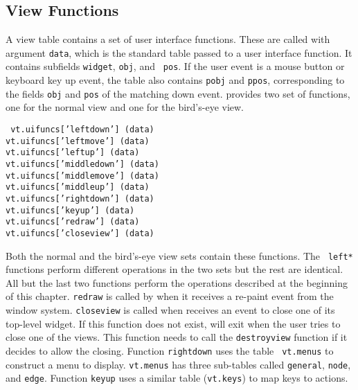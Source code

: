 \subsection{View Functions}

A view table contains a set of user interface functions. These are called with
argument {\tt data}, which is the standard {\LEFTY} table passed to a user
interface function. It contains subfields {\tt widget}, {\tt obj}, and {\tt
pos}. If the user event is a mouse button or keyboard key up event, the table
also contains {\tt pobj} and {\tt ppos}, corresponding to the fields {\tt obj}
and {\tt pos} of the matching down event. {\DOTTY} provides two set of
functions, one for the normal view and one for the bird's-eye view.

\begin{flushleft}\tt
vt.uifuncs['leftdown'] (data)\\
vt.uifuncs['leftmove'] (data)\\
vt.uifuncs['leftup'] (data)\\
vt.uifuncs['middledown'] (data)\\
vt.uifuncs['middlemove'] (data)\\
vt.uifuncs['middleup'] (data)\\
vt.uifuncs['rightdown'] (data)\\
vt.uifuncs['keyup'] (data)\\
vt.uifuncs['redraw'] (data)\\
vt.uifuncs['closeview'] (data)\\
\end{flushleft}\vspace{-2\itemsep}
Both the normal and the bird's-eye view sets contain these functions.  The {\tt
left*} functions perform different operations in the two sets but the rest are
identical.  All but the last two functions perform the operations described at
the beginning of this chapter. {\tt redraw} is called by {\LEFTY} when it
receives a re-paint event from the window system. {\tt closeview} is called
when {\LEFTY} receives an event to close one of its top-level widget. If this
function does not exist, {\LEFTY} will exit when the user tries to close one of
the views. This function needs to call the {\tt destroyview} function if it
decides to allow the closing.  Function {\tt rightdown} uses the table {\tt
vt.menus} to construct a menu to display. {\tt vt.menus} has three sub-tables
called {\tt general}, {\tt node}, and {\tt edge}. Function {\tt keyup} uses a
similar table ({\tt vt.keys}) to map keys to actions.

